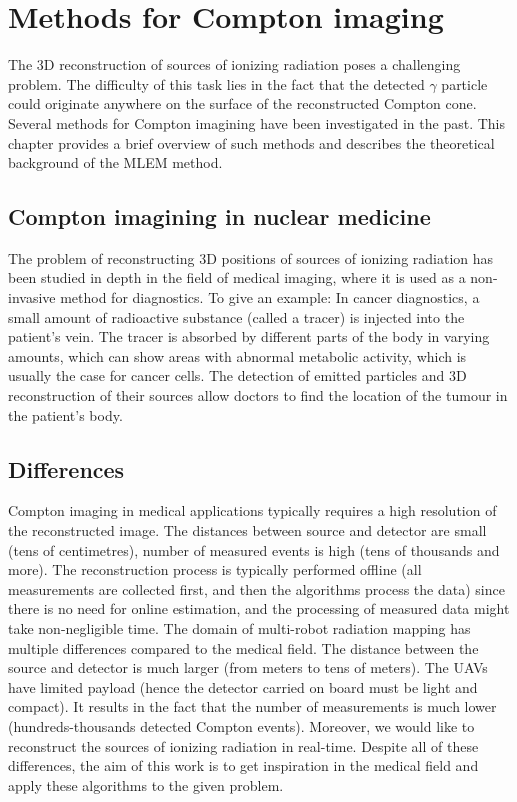 \chapter{Methods for Compton imaging\label{chap:mlem_theory}}
The 3D reconstruction of sources of ionizing radiation poses a challenging problem.
The difficulty of this task lies in the fact that the detected $\gamma$ particle could originate anywhere on the surface of the reconstructed Compton cone.
Several methods for Compton imagining have been investigated in the past.
This chapter provides a brief overview of such methods and describes the theoretical background of the \ac{MLEM} method.

\section{Compton imagining in nuclear medicine}
The problem of reconstructing 3D positions of sources of ionizing radiation has been studied in depth in the field of medical imaging, where it is used as a non-invasive method for diagnostics.
To give an example:
In cancer diagnostics, a small amount of radioactive substance (called a tracer) is injected into the patient's vein.
The tracer is absorbed by different parts of the body in varying amounts, which can show areas with abnormal metabolic activity, which is usually the case for cancer cells.
The detection of emitted particles and 3D reconstruction of their sources allow doctors to find the location of the tumour in the patient's body.

\section{Differences}
Compton imaging in medical applications typically requires a high resolution of the reconstructed image.
The distances between source and detector are small (tens of centimetres), number of measured events is high (tens of thousands and more).
The reconstruction process is typically performed offline (all measurements are collected first, and then the algorithms process the data) since there is no need for online estimation, and the processing of measured data might take non-negligible time.
The domain of multi-robot radiation mapping has multiple differences compared to the medical field.
The distance between the source and detector is much larger (from meters to tens of meters).
The \ac{UAV}s have limited payload (hence the detector carried on board must be light and compact).
It results in the fact that the number of measurements is much lower (hundreds-thousands detected Compton events).
Moreover, we would like to reconstruct the sources of ionizing radiation in real-time.
Despite all of these differences, the aim of this work is to get inspiration in the medical field and apply these algorithms to the given problem.

